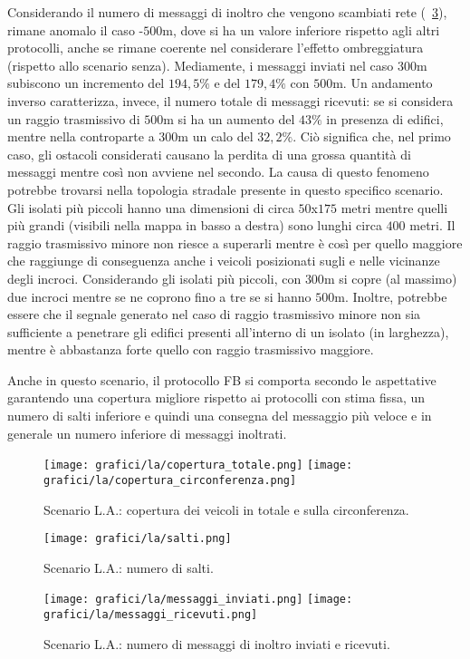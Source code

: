 Considerando il numero di messaggi di inoltro che vengono scambiati rete (\figurename~\ref{fig:risultati-la-messaggi}),
rimane anomalo il caso \statica{}-$500$m, dove si ha un valore inferiore rispetto agli altri protocolli,
anche se rimane coerente nel considerare l'effetto ombreggiatura (rispetto allo scenario senza).
Mediamente, i messaggi inviati nel caso $300$m subiscono un incremento del $194,5\%$ e del $179,4\%$
con $500$m.
Un andamento inverso caratterizza, invece, il numero totale di messaggi ricevuti:
se si considera un raggio trasmissivo di $500$m si ha un aumento del $43\%$ in presenza di edifici,
mentre nella controparte a $300$m un calo del $32,2\%$.
Ciò significa che, nel primo caso, gli ostacoli considerati causano la perdita di una grossa quantità di messaggi
mentre così non avviene nel secondo.
La causa di questo fenomeno potrebbe trovarsi nella topologia stradale presente in questo specifico scenario.
Gli isolati più piccoli hanno una dimensioni di circa $50$x$175$ metri mentre quelli più grandi
(visibili nella mappa in basso a destra) sono lunghi circa $400$ metri.
Il raggio trasmissivo minore non riesce a superarli mentre è così per quello maggiore che raggiunge
di conseguenza anche i veicoli posizionati sugli e nelle vicinanze degli incroci.
Considerando gli isolati più piccoli, con $300$m si copre (al massimo) due incroci mentre se ne coprono
fino a tre se si hanno $500$m.
Inoltre, potrebbe essere che il segnale generato nel caso di raggio trasmissivo minore
non sia sufficiente a penetrare gli edifici presenti all'interno di un isolato (in larghezza),
mentre è abbastanza forte quello con raggio trasmissivo maggiore.

Anche in questo scenario, il protocollo FB si comporta secondo le aspettative
garantendo una copertura migliore %
rispetto ai protocolli con stima fissa,
un numero di salti inferiore e quindi una consegna del messaggio più veloce
e in generale un numero inferiore di messaggi inoltrati.
%
\begin{figure}[htbp]
	\centering
		\texttt{[image: grafici/la/copertura\_totale.png]}
		\texttt{[image: grafici/la/copertura\_circonferenza.png]}
\caption{Scenario L.A.: copertura dei veicoli in totale e sulla circonferenza.\label{fig:risultati-la-copertura}}
\end{figure}
%
\begin{figure}[htbp]
	\centering
		\texttt{[image: grafici/la/salti.png]}
\caption{Scenario L.A.: numero di salti.\label{fig:risultati-la-salti}}
\end{figure}
%
\begin{figure}[htbp]
	\centering
		\texttt{[image: grafici/la/messaggi\_inviati.png]}
		\texttt{[image: grafici/la/messaggi\_ricevuti.png]}
\caption{Scenario L.A.: numero di messaggi di inoltro inviati e ricevuti.\label{fig:risultati-la-messaggi}}
\end{figure}
\clearpage
%
%
